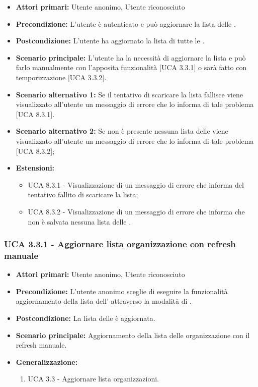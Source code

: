 \begin{itemize} 
	\item \textbf{Attori primari:} Utente anonimo, Utente riconosciuto
	\item \textbf{Precondizione:} L'utente è autenticato e può aggiornare la lista delle .
	\item \textbf{Postcondizione:} L'utente ha aggiornato la lista di tutte le .
	\item \textbf{Scenario principale:} L'utente ha la necessità di aggiornare la lista e può farlo manualmente con l'apposita funzionalità [UCA 3.3.1] o sarà fatto con temporizzazione [UCA 3.3.2].
	\item \textbf{Scenario alternativo 1:} Se il tentativo di scaricare la lista fallisce viene visualizzato all'utente un messaggio di errore che lo informa di tale problema [UCA 8.3.1].
	\item \textbf{Scenario alternativo 2:} Se non è presente nessuna lista delle  viene visualizzato all'utente un messaggio di errore che lo informa di tale problema [UCA 8.3.2];
	\item \textbf{Estensioni:}
	\begin{itemize}
		\item UCA 8.3.1 - Visualizzazione di un messaggio di errore che informa del tentativo fallito di scaricare la lista;
		\item UCA 8.3.2 - Visualizzazione di un messaggio di errore che informa che non è salvata nessuna lista delle .
	\end{itemize}
\end{itemize}

\subsubsection{UCA 3.3.1 - Aggiornare lista organizzazione con refresh manuale}%
\begin{itemize}
	\item \textbf{Attori primari:} Utente anonimo, Utente riconosciuto
	\item \textbf{Precondizione:} L'utente anonimo sceglie di eseguire la funzionalità aggiornamento della lista dell' attraverso la modalità di .
	\item \textbf{Postcondizione:} La lista delle  è aggiornata.	
	\item \textbf{Scenario principale:} Aggiornamento della lista delle organizzazione con il refresh manuale.
	\item \textbf{Generalizzazione:}
	\begin{enumerate}
	\item UCA 3.3 - Aggiornare lista organizzazioni.
	\end{enumerate}
\end{itemize}

